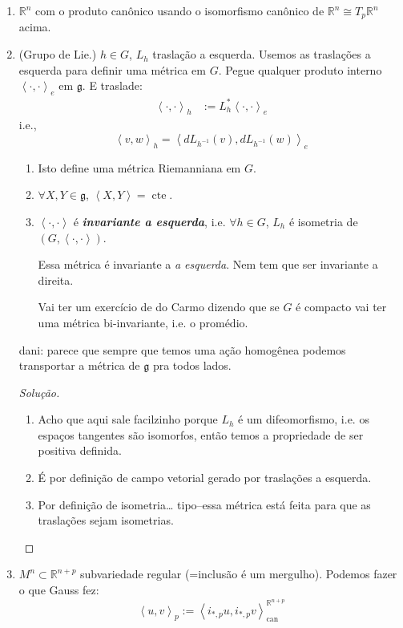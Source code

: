 \begin{example}\leavevmode
\begin{enumerate}
\item \(\mathbb{R}^n\) com o produto canônico usando o isomorfismo canônico de \(\mathbb{R}^n \cong T_p \mathbb{R}^n\) acima.

\item (Grupo de Lie.) \(h \in G\), \(L_h\) traslação a esquerda. Usemos as traslações a esquerda para definir uma métrica em \(G\). Pegue qualquer produto interno \(\left<\cdot,\cdot\right>_e\) em \(\mathfrak{g}\). E traslade:
	\begin{align*}
	\left<\cdot,\cdot\right>_h&:=L_h^*\left<\cdot,\cdot\right>_e
	\end{align*}
	i.e.,
	\[\left<v,w\right>_h=\left<dL_{h^{-1}}(v),dL_{h^{-1}}(w)\right>_e\]
\begin{exercise}\leavevmode
\begin{enumerate}
\item Isto define uma métrica Riemanniana em \(G\).
 \item \(\forall  X,Y \in \mathfrak{g}\), \(\left<X,Y\right>=\operatorname{cte}\).
 \item \(\left<\cdot,\cdot\right>\) é \textit{\textbf{invariante a esquerda}}, i.e. \(\forall  h \in G\), \(L_h\) é isometria de \((G,\left<\cdot,\cdot\right>)\).
\begin{remark}\leavevmode
Essa métrica é invariante a \textit{a esquerda}. Nem tem que ser invariante a direita.
\end{remark}
\begin{remark}\leavevmode
Vai ter um exercício de do Carmo dizendo que se \(G\) é compacto vai ter uma métrica bi-invariante, i.e. o promédio.
\end{remark}
\end{enumerate}
	{\color{7}dani:} parece que sempre que temos uma ação homogênea podemos transportar a métrica de \(\mathfrak{g}\) pra todos lados.
\end{exercise}	
\begin{proof}[Solução]\leavevmode
\begin{enumerate}
\item Acho que aqui sale facilzinho porque \(L_h\) é um difeomorfismo, i.e. os espaços tangentes são isomorfos, então temos a propriedade de ser positiva definida.

\item É por definição de campo vetorial gerado por traslações a esquerda.

\item Por definição de isometria… tipo--essa métrica está feita para que as traslações sejam isometrias.
\end{enumerate}
\end{proof}
\item \(M^n \subset \mathbb{R}^{n+p}\) subvariedade regular (=inclusão é um mergulho). Podemos fazer o que Gauss fez:
	\[\left<u,v\right>_p:=\left<i_{*,p}u,i_{*,p}v\right>^{\mathbb{R}^{n+p}}_{\operatorname{can}}\]
\end{enumerate}
\end{example}

